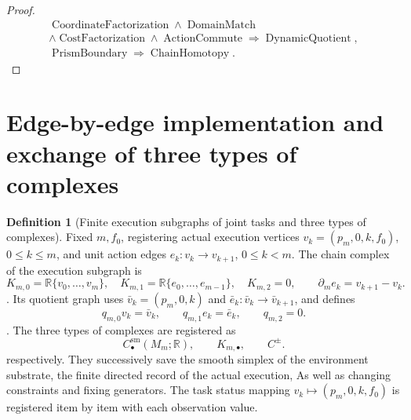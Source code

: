 \documentclass[12pt,a4paper,openany,notitlepage]{report}
\theoremstyle{plain}
\theoremstyle{definition}
\newtheorem{definition}[theorem]{Definition}
\theoremstyle{remark}
\begin{document}
\begin{CJK*}
\begin{proof}
\[\begin{gathered}
\operatorname{CoordinateFactorization}
\land\operatorname{DomainMatch}\\
\land\operatorname{CostFactorization}
\land\operatorname{ActionCommute}
\Rightarrow\operatorname{DynamicQuotient},\\
\operatorname{PrismBoundary}\Rightarrow\operatorname{ChainHomotopy}.
\end{gathered}
\]\end{proof}


\section { Edge-by-edge implementation and exchange of three types of complexes }

\begin{definition}
[Finite execution subgraphs of joint tasks and three types of complexes]\label{hgov:def:jointgraph}
Fixed $m,f_0$, registering actual execution vertices $v_k=(p_m,0,k,f_0)$, $0\le k\le m$, and unit action edges $e_k:v_k\to v_{k+1}$, $0\le k<m$. The chain complex of the execution subgraph is \[
 K_{m,0}=\mathbb R\{v_0,\ldots,v_m\},\quad
 K_{m,1}=\mathbb R\{e_0,\ldots,e_{m-1}\},\quad
 K_{m,2}=0,\qquad
 \partial_me_k=v_{k+1}-v_k.
\]. Its quotient graph uses $\bar v_k=(p_m,0,k)$ and $\bar e_k:\bar v_k\to\bar v_{k+1}$, and defines \[
 q_{m,0}v_k=\bar v_k,\qquad
 q_{m,1}e_k=\bar e_k,\qquad q_{m,2}=0.
\]. The three types of complexes are registered as \[
 C_\bullet^{\mathrm{sm}}(M_m;\mathbb R),\qquad
 K_{m,\bullet},\qquad C^\pm.
\] respectively. They successively save the smooth simplex of the environment substrate, the finite directed record of the actual execution, As well as changing constraints and fixing generators. The task status mapping $v_k\mapsto(p_m,0,k,f_0)$ is registered item by item with each observation value.\end{definition}



\end{CJK*}
\end{document}
